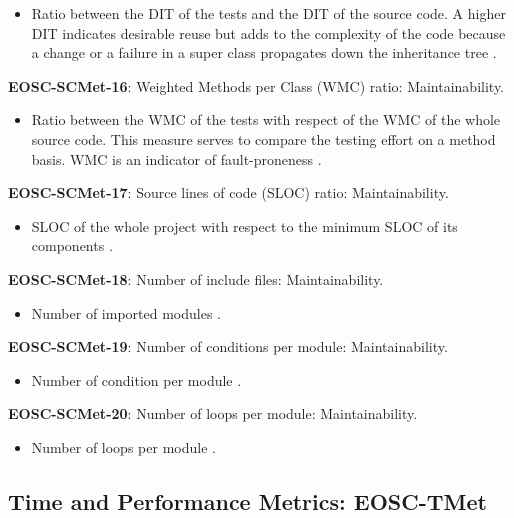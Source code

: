 \begin{itemize}
    \item Ratio between the DIT of the tests and the DIT of the source code. A higher DIT indicates desirable reuse but adds to the complexity of the code because a change or a failure in a super class propagates down the inheritance tree \cite{nagappan_early_2005}.
\end{itemize}

\textbf{EOSC-SCMet-16}: Weighted Methods per Class (WMC) ratio: Maintainability.

\begin{itemize}
    \item Ratio between the WMC of the tests with respect of the WMC of the whole source code. This measure serves to compare the testing effort on a method basis. WMC is an indicator of fault-proneness \cite{nagappan_early_2005}.
\end{itemize}

\textbf{EOSC-SCMet-17}: Source lines of code (SLOC) ratio: Maintainability.

\begin{itemize}
    \item SLOC of the whole project with respect to the minimum SLOC of its components \cite{nagappan_early_2005}.
\end{itemize}

\textbf{EOSC-SCMet-18}: Number of include files: Maintainability.

\begin{itemize}
    \item Number of imported modules \cite{ogasawara_experiences_1996}.
\end{itemize}

\textbf{EOSC-SCMet-19}: Number of conditions per module: Maintainability.

\begin{itemize}
    \item Number of condition per module \cite{ogasawara_experiences_1996}.
\end{itemize}

\textbf{EOSC-SCMet-20}: Number of loops per module: Maintainability.

\begin{itemize}
    \item Number of loops per module \cite{ogasawara_experiences_1996}.
\end{itemize}

\subsection{Time and Performance Metrics: EOSC-TMet}

